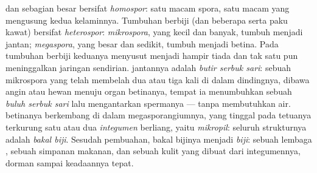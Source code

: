 \begin{definition}\label{def:b2:plant-life-cycles:heterospory}
 dan sebagian besar  bersifat \emph{homospor}: satu
macam spora, satu macam  yang mengusung kedua kelaminnya.
Tumbuhan berbiji (dan beberapa  serta paku kawat)
bersifat \emph{heterospor}: \emph{mikrospora}, yang kecil dan banyak,
tumbuh menjadi  jantan; \emph{megaspora}, yang besar dan
sedikit, tumbuh menjadi  betina. Pada tumbuhan berbiji
keduanya menyusut menjadi hampir tiada dan tak satu pun meninggalkan
jaringan  sendirian.  jantannya adalah \emph{butir
serbuk sari}: sebuah mikrospora yang telah membelah dua atau tiga kali
di dalam dindingnya, dibawa angin atau hewan menuju organ betinanya,
tempat ia menumbuhkan sebuah \emph{buluh serbuk sari} lalu
mengantarkan spermanya --- tanpa membutuhkan air.  betinanya
berkembang di dalam megasporangiumnya, yang tinggal pada tetuanya
terkurung satu atau dua \emph{integumen} berliang, yaitu
\emph{mikropil}: seluruh strukturnya adalah \emph{bakal biji}. Sesudah
pembuahan, bakal bijinya menjadi \emph{biji}: sebuah lembaga ,
sebuah simpanan makanan, dan sebuah kulit yang dibuat dari
integumennya, dorman sampai keadaannya tepat.
\end{definition}

